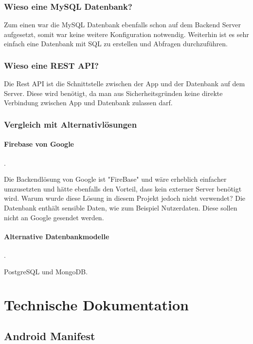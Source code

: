 \documentclass{scrartcl}
\begin{document}
\subsubsection{Wieso eine MySQL Datenbank?}

Zum einen war die MySQL Datenbank ebenfalls schon auf dem Backend Server aufgesetzt, somit war keine weitere Konfiguration notwendig. Weiterhin ist es sehr einfach eine Datenbank mit SQL zu erstellen und Abfragen durchzuführen.

\subsubsection{Wieso eine REST API?}

Die Rest API ist die Schnittstelle zwischen der App und der Datenbank auf dem Server. Diese wird benötigt, da man aus Sicherheitsgründen keine direkte Verbindung zwischen App und Datenbank zulassen darf.

\subsubsection{Vergleich mit Alternativlösungen}

\paragraph{Firebase von Google}.\newline

\noindent Die Backendlösung von Google ist "FireBase" und wäre erheblich einfacher umzusetzten und hätte ebenfalls den Vorteil, dass kein externer Server benötigt wird. Warum wurde diese Lösung in diesem Projekt jedoch nicht verwendet? Die Datenbank enthält sensible Daten, wie zum Beispiel Nutzerdaten. Diese sollen nicht an Google gesendet werden.

\paragraph{Alternative Datenbankmodelle}.\newline

\noindent PostgreSQL und MongoDB.

\newpage

\section{Technische Dokumentation}

\subsection{Android Manifest}
\end{document}
